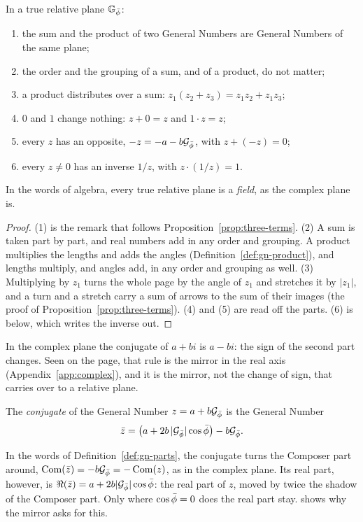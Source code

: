 \begin{theorem}\label{thm:gn-field}
In a true relative plane $\mathbb{G}_{\bar{\phi}}$:
\begin{enumerate}
  \item the sum and the product of two General Numbers are General Numbers of the same plane;
  \item the order and the grouping of a sum, and of a product, do not matter;
  \item a product distributes over a sum: $z_1(z_2 + z_3) = z_1 z_2 + z_1 z_3$;
  \item $0$ and $1$ change nothing: $z + 0 = z$ and $1 \cdot z = z$;
  \item every $z$ has an opposite, $-z = -a - b\mathcal{G}_{\bar{\phi}}$, with $z + (-z) = 0$;
  \item every $z \neq 0$ has an inverse $1/z$, with $z \cdot (1/z) = 1$.
\end{enumerate}
In the words of algebra, every true relative plane is a \emph{field}, as the complex plane is.
\end{theorem}

\begin{proof}
(1) is the remark that follows Proposition~\ref{prop:three-terms}. (2) A sum is taken part by part, and real numbers add in any order and grouping. A product multiplies the lengths and adds the angles (Definition~\ref{def:gn-product}), and lengths multiply, and angles add, in any order and grouping as well. (3) Multiplying by $z_1$ turns the whole page by the angle of $z_1$ and stretches it by $|z_1|$, and a turn and a stretch carry a sum of arrows to the sum of their images (the proof of Proposition~\ref{prop:three-terms}). (4) and (5) are read off the parts. (6) is  below, which writes the inverse out.
\end{proof}

In the complex plane the conjugate of $a + bi$ is $a - bi$: the sign of the second part changes. Seen on the page, that rule is the mirror in the real axis (Appendix~\ref{app:complex}), and it is the mirror, not the change of sign, that carries over to a relative plane.

\begin{definition}\label{def:gn-conjugate}
The \emph{conjugate} of the General Number $z = a + b\mathcal{G}_{\bar{\phi}}$ is the General Number
\[
\bar{z} = \bigl(a + 2b\,|\mathcal{G}_{\bar{\phi}}|\cos\bar{\phi}\bigr) - b\mathcal{G}_{\bar{\phi}} .
\]
\end{definition}

In the words of Definition~\ref{def:gn-parts}, the conjugate turns the Composer part around, $\operatorname{Com}(\bar{z}) = -b\mathcal{G}_{\bar{\phi}} = -\operatorname{Com}(z)$, as in the complex plane. Its real part, however, is $\Re(\bar{z}) = a + 2b|\mathcal{G}_{\bar{\phi}}|\cos\bar{\phi}$: the real part of $z$, moved by twice the shadow of the Composer part. Only where $\cos\bar{\phi} = 0$ does the real part stay.  shows why the mirror asks for this.

